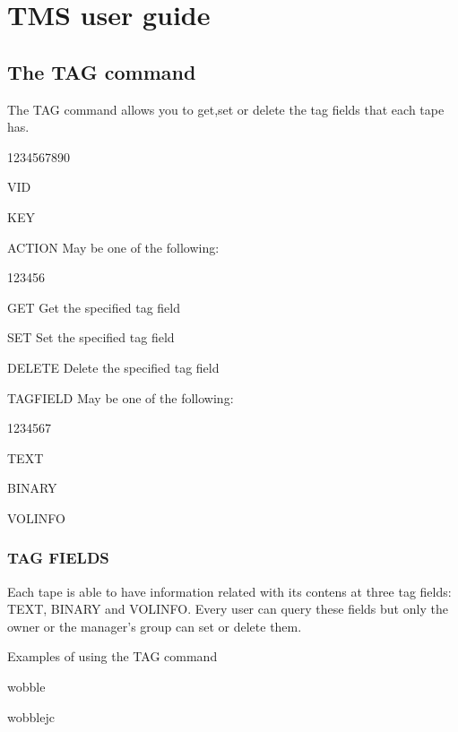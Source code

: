 \chapter{TMS user guide}

\section{The TAG command}


The TAG command allows you to get,set or delete the tag fields that
each tape has. 

\begin{DLtt}{1234567890}
\item[VID]
\item[KEY]
\item[ACTION]May be one of the following:
\begin{DLtt}{123456}
\item[GET]Get the specified tag field
\item[SET]Set the specified tag field
\item[DELETE]Delete the specified tag field
\end{DLtt}
\item[TAGFIELD]May be one of the following:
\begin{DLtt}{1234567}
\item[TEXT]
\item[BINARY]
\item[VOLINFO]
\end{DLtt}
\end{DLtt}

\subsection{TAG FIELDS}

	Each tape is able to have information related with its contens at
	three tag fields: TEXT, BINARY and VOLINFO. Every user can query
	these fields but only the owner or the manager's group can set or
	delete them.    


\begin{XMPt}{Examples of using the TAG command}

	wobble


	wobblejc

\end{XMPt}

